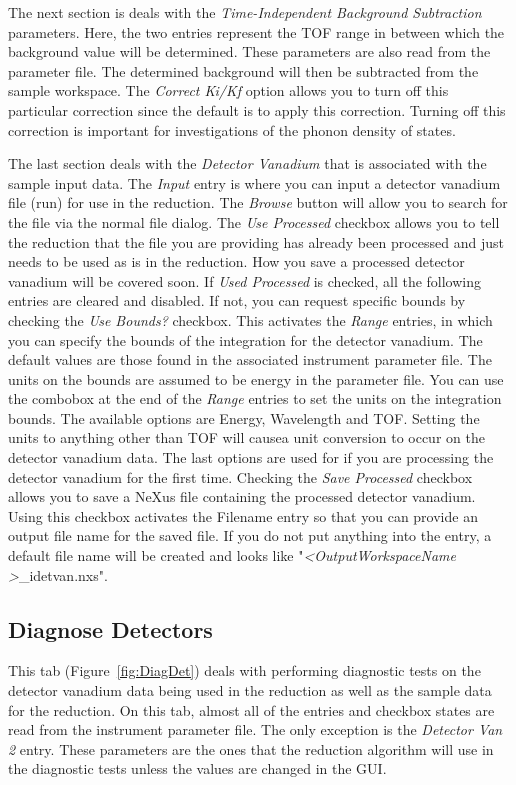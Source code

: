 The next section is deals with the \textit{Time-Independent Background Subtraction} parameters. Here, the two entries represent the TOF range in between which the background value will be determined. These parameters are also read from the parameter file. The determined background will then be subtracted from the sample workspace. The \textit{Correct Ki/Kf} option allows you to turn off this particular correction since the default is to apply this correction. Turning off this correction is important for investigations of the phonon density of states.

The last section deals with the \textit{Detector Vanadium} that is associated with the sample input data. The \textit{Input} entry is where you can input a detector vanadium file (run) for use in the reduction. The \textit{Browse} button will allow you to search for the file via the normal file dialog. The \textit{Use Processed} checkbox allows you to tell the reduction that the file you are providing has already been processed and just needs to be used as is in the reduction. How you save a processed detector vanadium will be covered soon. If \textit{Used Processed} is checked, all the following entries are cleared and disabled. If not, you can request specific bounds by checking the \textit{Use Bounds?} checkbox. This activates the \textit{Range} entries, in which you can specify the bounds of the integration for the detector vanadium. The default values are those found in the associated instrument parameter file. The units on the bounds are assumed to be energy in the parameter file. You can use the combobox at the end of the \textit{Range} entries to set the units on the integration bounds. The available options are Energy, Wavelength and TOF. Setting the units to anything other than TOF will causea unit conversion to occur on the detector vanadium data. The last options are used for if you are processing the detector vanadium for the first time. Checking the \textit{Save Processed} checkbox allows you to save a NeXus file containing the processed detector vanadium. Using this checkbox activates the Filename entry so that you can provide an output file name for the saved file. If you do not put anything into the entry, a default file name will be created and looks like "\textit{\textless OutputWorkspaceName \textgreater}\_idetvan.nxs". 
\subsection{Diagnose Detectors}\label{sec:UI-DiagDet}
This tab (Figure~\ref{fig:DiagDet}) deals with performing diagnostic tests on the detector vanadium data being used in the reduction as well as the sample data for the reduction. On this tab, almost all of the entries and checkbox states are read from the instrument parameter file. The only exception is the \textit{Detector Van 2} entry. These parameters are the ones that the reduction algorithm will use in the diagnostic tests unless the values are changed in the GUI. 

